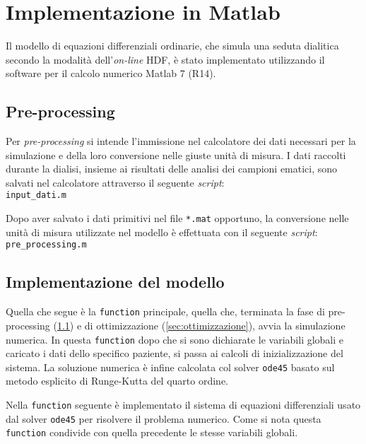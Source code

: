 \chapter{Implementazione in Matlab}\label{app:matlab}
Il modello di equazioni differenziali ordinarie, che simula una seduta dialitica secondo la modalità dell'\textit{on-line} HDF, è stato implementato utilizzando il software per il calcolo numerico Matlab\textsuperscript\textregistered{} 7 (R14).

\section{Pre-processing}\label{sec:pre_processing}
Per \textit{pre-processing} si intende l'immissione nel calcolatore dei dati necessari per la simulazione e della loro conversione nelle giuste unità di misura. I dati raccolti durante la dialisi, insieme ai risultati delle analisi dei campioni ematici, sono salvati nel calcolatore attraverso il seguente \textit{script}:\\
\newline
\verb|input_dati.m|


Dopo aver salvato i dati primitivi nel file \verb|*.mat| opportuno, la conversione nelle unità di misura utilizzate nel modello è effettuata con il seguente \textit{script}:\\
\newline
\verb|pre_processing.m|


\section{Implementazione del modello}
Quella che segue è la \verb|function| principale, quella che, terminata la fase di pre-processing (\textsection\ref{sec:pre_processing}) e di ottimizzazione (\textsection\ref{sec:ottimizzazione}), avvia la simulazione numerica. In questa \verb|function| dopo che si sono dichiarate le variabili globali e caricato i dati dello specifico paziente, si passa ai calcoli di inizializzazione del sistema. La soluzione numerica è infine calcolata col solver \verb|ode45| basato sul metodo esplicito di Runge-Kutta del quarto ordine.

\vspace{10pt}
Nella \verb|function| seguente è implementato il sistema di equazioni differenziali usato dal solver \verb|ode45| per risolvere il problema numerico. Come si nota questa \verb|function| condivide con quella precedente le stesse variabili globali.


